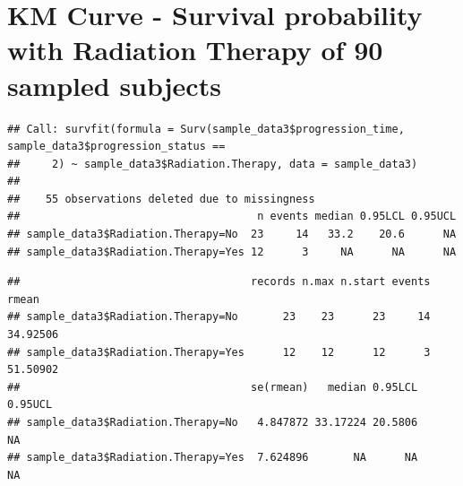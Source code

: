 \documentclass[
  11pt,
]{article}
\newenvironment{Shaded}{\begin{snugshade}}{\end{snugshade}}
\newcommand{\AttributeTok}[1]{\textcolor[rgb]{0.77,0.63,0.00}{#1}}
\newcommand{\DecValTok}[1]{\textcolor[rgb]{0.00,0.00,0.81}{#1}}
\newcommand{\FunctionTok}[1]{\textcolor[rgb]{0.00,0.00,0.00}{#1}}
\newcommand{\NormalTok}[1]{#1}
\newcommand{\OtherTok}[1]{\textcolor[rgb]{0.56,0.35,0.01}{#1}}
\newcommand{\SpecialCharTok}[1]{\textcolor[rgb]{0.00,0.00,0.00}{#1}}
\begin{document}
\newpage
\section{KM Curve - Survival probability with Radiation Therapy of 90 sampled subjects}

\begin{Shaded}
\end{Shaded}

\begin{verbatim}
## Call: survfit(formula = Surv(sample_data3$progression_time, sample_data3$progression_status == 
##     2) ~ sample_data3$Radiation.Therapy, data = sample_data3)
## 
##    55 observations deleted due to missingness 
##                                     n events median 0.95LCL 0.95UCL
## sample_data3$Radiation.Therapy=No  23     14   33.2    20.6      NA
## sample_data3$Radiation.Therapy=Yes 12      3     NA      NA      NA
\end{verbatim}

\begin{Shaded}
\end{Shaded}

\begin{verbatim}
##                                    records n.max n.start events    rmean
## sample_data3$Radiation.Therapy=No       23    23      23     14 34.92506
## sample_data3$Radiation.Therapy=Yes      12    12      12      3 51.50902
##                                    se(rmean)   median 0.95LCL 0.95UCL
## sample_data3$Radiation.Therapy=No   4.847872 33.17224 20.5806      NA
## sample_data3$Radiation.Therapy=Yes  7.624896       NA      NA      NA
\end{verbatim}
\end{document}
